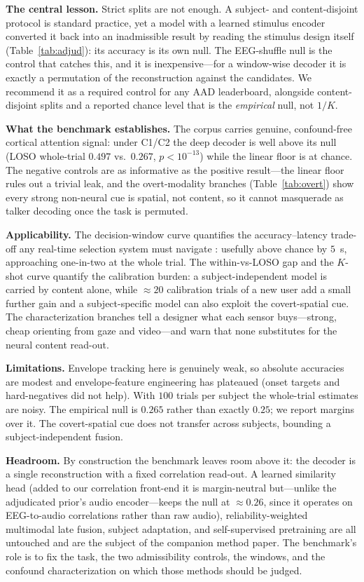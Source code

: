 \documentclass[journal]{IEEEtran}
\newcommand{\chance}{0.25}
\begin{document}
\textbf{The central lesson.} Strict splits are not enough. A subject- and
content-disjoint protocol is standard practice, yet a model with a learned stimulus
encoder converted it back into an inadmissible result by reading the stimulus design
itself (Table~\ref{tab:adjud}): its accuracy is its own null. The EEG-shuffle null is
the control that catches this, and it is inexpensive---for a window-wise decoder it is
exactly a permutation of the reconstruction against the candidates. We recommend it as
a required control for any AAD leaderboard, alongside content-disjoint splits and a
reported chance level that is the \emph{empirical} null, not $1/K$.

\textbf{What the benchmark establishes.} The corpus carries genuine, confound-free
cortical attention signal: under C1/C2 the deep decoder is well above its null (LOSO
whole-trial $0.497$ vs.\ $0.267$, $p<10^{-13}$) while the linear floor is at chance.
The negative controls are as informative as the positive result---the linear floor
rules out a trivial leak, and the overt-modality branches (Table~\ref{tab:overt}) show
every strong non-neural cue is spatial, not content, so it cannot masquerade as talker
decoding once the task is permuted.

\textbf{Applicability.} The decision-window curve quantifies the accuracy--latency
trade-off any real-time selection system must navigate \cite{geirnaert2021}: usefully
above chance by $5$~s, approaching one-in-two at the whole trial. The within-vs-LOSO
gap and the $K$-shot curve quantify the calibration burden: a subject-independent model
is carried by content alone, while $\approx\!20$ calibration trials of a new user add a
small further gain and a subject-specific model can also exploit the covert-spatial
cue. The characterization branches tell a designer what each sensor buys---strong,
cheap orienting from gaze and video---and warn that none substitutes for the neural
content read-out.

\textbf{Limitations.} Envelope tracking here is genuinely weak, so absolute accuracies
are modest and envelope-feature engineering has plateaued (onset targets and
hard-negatives did not help). With $100$ trials per subject the whole-trial estimates
are noisy. The empirical null is $0.265$ rather than exactly $\chance$; we report
margins over it. The covert-spatial cue does not transfer across subjects, bounding a
subject-independent fusion.

\textbf{Headroom.} By construction the benchmark leaves room above it: the decoder is a
single reconstruction with a fixed correlation read-out. A learned similarity head
(added to our correlation front-end it is margin-neutral but---unlike the adjudicated
prior's audio encoder---keeps the null at $\approx\!0.26$, since it operates on
EEG-to-audio correlations rather than raw audio), reliability-weighted multimodal late
fusion, subject adaptation, and self-supervised pretraining are all untouched and are
the subject of the companion method paper. The benchmark's role is to fix the task,
the two admissibility controls, the windows, and the confound characterization on which
those methods should be judged.
\end{document}
